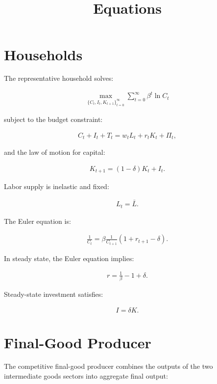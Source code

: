 \documentclass[12pt]{article}
\title{Equations}
\author{}
\date{}
\begin{document}
\maketitle

\section{Households}

The representative household solves:

\begin{align}
\max_{\{C_t,I_t,K_{t+1}\}_{t=0}^{\infty}}
\sum_{t=0}^{\infty} \beta^t \ln C_t
\end{align}

subject to the budget constraint:

\begin{align}
C_t + I_t + T_t
=
w_t L_t + r_t K_t + \Pi_t,
\end{align}

and the law of motion for capital:

\begin{align}
K_{t+1}
=
(1-\delta)K_t + I_t.
\end{align}

Labor supply is inelastic and fixed:

\begin{align}
L_t = \bar{L}.
\end{align}

The Euler equation is:

\begin{align}
\frac{1}{C_t}
=
\beta
\frac{1}{C_{t+1}}
(1+r_{t+1}-\delta).
\end{align}

In steady state, the Euler equation implies:

\begin{align}
r
=
\frac{1}{\beta}
-
1
+
\delta.
\end{align}

Steady-state investment satisfies:

\begin{align}
I = \delta K.
\end{align}

\section{Final-Good Producer}

The competitive final-good producer combines the outputs of the two intermediate goods sectors into aggregate final output:
\end{document}
